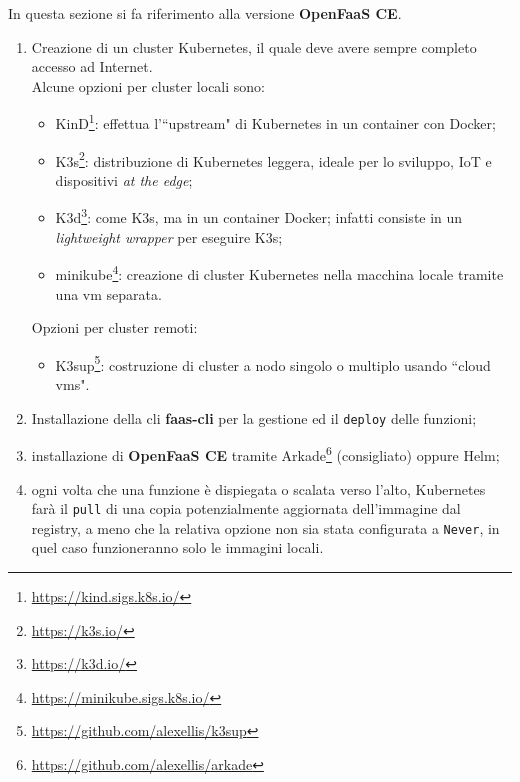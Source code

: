 \documentclass[12pt,a4paper,openany,twoside]{book}
\begin{document}
In questa sezione si fa riferimento alla versione \textbf{OpenFaaS CE}.
\begin{enumerate}
    \item Creazione di un cluster Kubernetes, il quale deve avere sempre completo accesso ad Internet.
    \\
    Alcune opzioni per cluster locali sono:
    \begin{itemize}
        \item KinD\footnote{\url{https://kind.sigs.k8s.io/}}: effettua l'``upstream" di Kubernetes in un container con Docker;
        
        \item K3s\footnote{\url{https://k3s.io/}}: distribuzione di Kubernetes leggera, ideale per lo sviluppo, \ac{IoT} e dispositivi \textit{at the edge};
        
        \item K3d\footnote{\url{https://k3d.io/}}: come K3s, ma in un container Docker; infatti consiste in un \textit{lightweight wrapper} per eseguire K3s;
        
        \item minikube\footnote{\url{https://minikube.sigs.k8s.io/}}: creazione di cluster Kubernetes nella macchina locale tramite una \ac{vm} separata.
    \end{itemize}

    Opzioni per cluster remoti:
    \begin{itemize}
        \item K3sup\footnote{\url{https://github.com/alexellis/k3sup}}: costruzione di cluster a nodo singolo o multiplo usando ``cloud \acp{vm}".
    \end{itemize}
    
    \item Installazione della \ac{cli} \textbf{faas-cli} per la gestione ed il \texttt{deploy} delle funzioni;
    
    \item installazione di \textbf{OpenFaaS CE} tramite Arkade\footnote{\url{https://github.com/alexellis/arkade}} (consigliato) oppure Helm;
    
    \item ogni volta che una funzione è dispiegata o scalata verso l'alto, Kubernetes farà il \texttt{pull} di una copia potenzialmente aggiornata dell'immagine dal registry, a meno che la relativa opzione non sia stata configurata a \texttt{Never}, in quel caso funzioneranno solo le immagini locali.
\end{enumerate}
\end{document}
